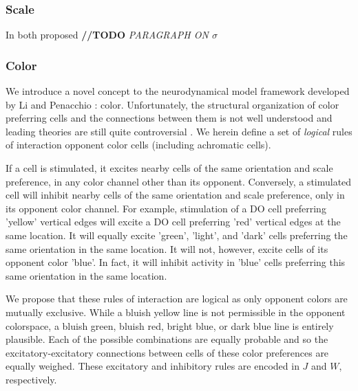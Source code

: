 \documentclass[journal,onecolumn]{IEEEtran}
\begin{document}
\subsubsection*{Scale} In both proposed 
\textbf{//TODO} \textit{PARAGRAPH ON $\sigma$}

\subsubsection*{Color}
We introduce a novel concept to the neurodynamical model framework developed by Li \cite{li:1999} and Penacchio \cite{otazu:plosone}: color. Unfortunately, the structural organization of color preferring cells and the connections between them is not well understood and leading theories are still quite controversial \cite{shapley:2011}. We herein define a set of \textit{logical} rules of interaction opponent color cells (including achromatic cells).

If a cell is stimulated, it excites nearby cells of the same orientation and scale preference, in any color channel other than its opponent. Conversely, a stimulated cell will inhibit nearby cells of the same orientation and scale preference, only in its opponent color channel. For example, stimulation of a DO cell preferring 'yellow' vertical edges will excite a DO cell preferring 'red' vertical edges at the same location. It will equally excite 'green', 'light', and 'dark' cells preferring the same orientation in the same location. It will not, however, excite cells of its opponent color 'blue'. In fact, it will inhibit activity in 'blue' cells preferring this same orientation in the same location.

We propose that these rules of interaction are logical as only opponent colors are mutually exclusive. While a bluish yellow line is not permissible in the opponent colorspace, a bluish green, bluish red, bright blue, or dark blue line is entirely plausible. Each of the possible combinations are equally probable and so the excitatory-excitatory connections between cells of these color preferences are equally weighed. These excitatory and inhibitory rules are encoded in $J$ and $W$, respectively.
\end{document}
